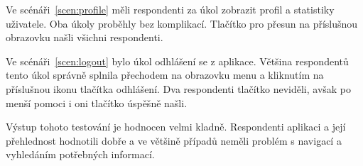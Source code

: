 Ve scénáři~\ref{scen:profile} měli respondenti za úkol zobrazit profil a
statistiky uživatele.
Oba úkoly proběhly bez komplikací.
Tlačítko pro přesun na příslušnou obrazovku našli všichni respondenti.

Ve scénáři~\ref{scen:logout} bylo úkol odhlášení se z aplikace.
Většina respondentů tento úkol správně splnila přechodem na obrazovku menu
a kliknutím na příslušnou ikonu tlačítka odhlášení.
Dva respondenti tlačítko neviděli,
avšak po menší pomoci i oni tlačítko úspěšně našli.

Výstup tohoto testování je hodnocen velmi kladně.
Respondenti aplikaci a její přehlednost hodnotili dobře a ve většině případů
neměli problém s navigací a vyhledáním potřebných informací.